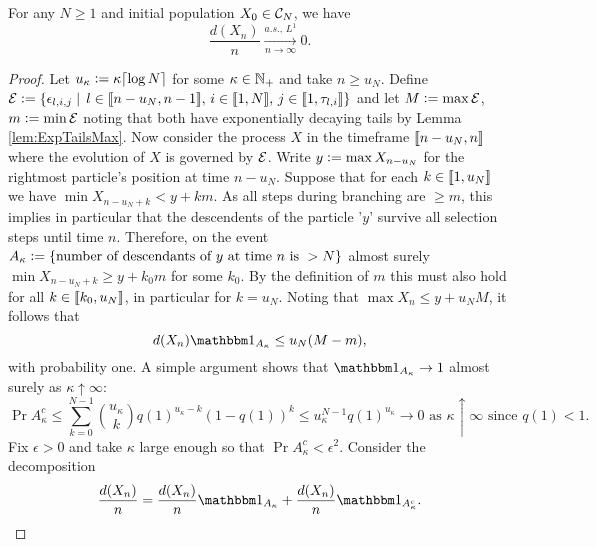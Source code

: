 \begin{proposition}\label{prop:diameter}
For any $N \geq 1$ and initial population $X_0 \in \cal{C}_N$, we have 
\begin{equation*}
\frac{d(X_n)}{n} \xrightarrow[n \to \infty]{a.s.,\, L^1} 0. 
\end{equation*}
\end{proposition}

\begin{proof}
Let $u_\kappa \defeq \kappa\ceil{\log N}$ for some $\kappa \in \N_+$ and take $n \geq u_N$. Define $\cal{E} \defeq \{ \epsilon_{l, i, j} \mid\, l \in \bbracket{n - u_N,n - 1},\, i \in \bbracket{1, N},\, j \in \bbracket{1, \tau_{l,i}} \}$ and let $M \defeq \max \cal{E}$, $m \defeq \min \cal{E}$ noting that both have exponentially decaying tails by Lemma \ref{lem:ExpTailsMax}. Now consider the process $X$ in the timeframe $\bbracket{n - u_N, n}$ where the evolution of $X$ is governed by $\cal{E}$. Write $y \defeq \max X_{n - u_N}$ for the rightmost particle's position at time $n-u_N$. Suppose that for each $k \in \bbracket{1, u_N}$ we have $\min X_{n - u_N + k} < y + k m$. As all steps during branching are $ \geq m$, this implies in particular that the descendents of the particle '$y$' survive all selection steps until time $n$. Therefore, on the event $A_\kappa \defeq \{ \text{number of descendants of } y \text{ at time } n \text{ is } > N\}$ almost surely $\min X_{n - u_N + k} \geq y + k_0 m$ for some $k_0$. By the definition of $m$ this must also hold for all $k \in \bbracket{k_0, u_N}$, in particular for $k = u_N$. Noting that $\max X_n \leq y + u_N M$, it follows that 
\begin{equation}\label{eqn:ExpTailDiamUpperBound}
d(X_n)\Ind_{A_\kappa} \leq u_N (M - m), 
\end{equation}
with probability one. A simple argument shows that $\Ind_{A_\kappa} \to 1$ almost surely as $\kappa \uparrow \infty$: 
\begin{equation}
\Pr{A^c_\kappa} \leq \sum\limits_{k = 0}^{N - 1} {u_\kappa \choose k} q(1)^{u_\kappa - k} (1 - q(1))^k \leq u_\kappa^{N-1} q(1)^{u_\kappa} \to 0 \text{ as } \kappa \uparrow \infty \text{ since } q(1) < 1. 
\end{equation}
Fix $\epsilon > 0$ and take $\kappa$ large enough so that $\Pr{A_\kappa^c} < \epsilon^2$. Consider the decomposition
\begin{equation}\label{eqn:ExpTailsDiamDecomp}
\frac{d(X_n)}{n} = \frac{d(X_n)}{n} \Ind_{A_\kappa} + \frac{d(X_n)}{n} \Ind_{A_\kappa^c}. 
\end{equation}

\end{proof}
